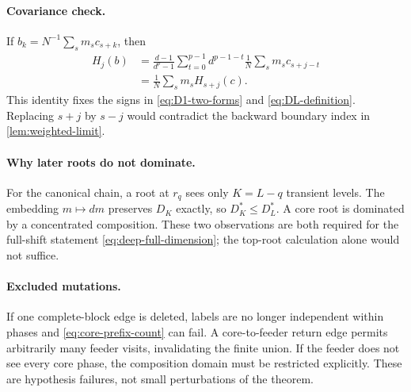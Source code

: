 \paragraph{Covariance check.}
If $b_k=N^{-1}\sum_sm_sc_{s+k}$, then
\begin{align*}
 H_j(b)
 &=\frac{d-1}{d^p-1}\sum_{t=0}^{p-1}d^{p-1-t}
   \frac1N\sum_sm_sc_{s+j-t}\\
 &=\frac1N\sum_sm_sH_{s+j}(c).
\end{align*}
This identity fixes the signs in \eqref{eq:D1-two-forms} and
\eqref{eq:DL-definition}.  Replacing $s+j$ by $s-j$ would contradict the
backward boundary index in \cref{lem:weighted-limit}.

\paragraph{Why later roots do not dominate.}
For the canonical chain, a root at $r_q$ sees only $K=L-q$ transient levels.
The embedding $m\mapsto dm$ preserves $D_K$ exactly, so
$D_K^*\leq D_L^*$.  A core root is dominated by a concentrated composition.
These two observations are both required for the full-shift statement
\eqref{eq:deep-full-dimension}; the top-root calculation alone would not
suffice.

\paragraph{Excluded mutations.}
If one complete-block edge is deleted, labels are no longer independent
within phases and \eqref{eq:core-prefix-count} can fail.  A core-to-feeder
return edge permits arbitrarily many feeder visits, invalidating the finite
union.  If the feeder does not see every core phase, the composition domain
must be restricted explicitly.  These are hypothesis failures, not small
perturbations of the theorem.
